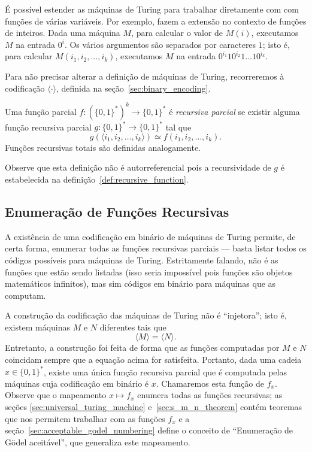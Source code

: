 É possível estender as máquinas de Turing
para trabalhar diretamente com com funções de várias variáveis.
Por exemplo, 
fazem a extensão no contexto de funções de inteiros.
Dada uma máquina $M$,
para calcular o valor de $M(i)$,
executamos $M$ na entrada $0^i$.
Os vários argumentos são separados por caracteres $1$;
isto é, para calcular $M(i_1, i_2, \dots, i_k)$,
executamos $M$ na entrada $0^{i_1} 1 0^{i_2} 1 \dots 1 0^{i_k}$.

Para não precisar alterar a definição de máquinas de Turing,
recorreremos à codificação $\langle \cdot \rangle$,
definida na seção~\ref{sec:binary_encoding}.

\begin{definition}
    \label{def:multi_valued_recursive_function}
    Uma função parcial $f: (\{0, 1\}^*)^k \to \{0, 1\}^*$ é \emph{recursiva parcial}
    se existir alguma função recursiva parcial $g: \{0, 1\}^* \to \{0, 1\}^*$
    tal que
    \begin{equation*}
        g(\langle i_1, i_2, \dots, i_k \rangle) \simeq f(i_1, i_2, \dots, i_k).
    \end{equation*}
    Funções recursivas totais são definidas analogamente.
\end{definition}

Observe que esta definição não é autorreferencial
pois a recursividade de $g$ é estabelecida na definição~\ref{def:recursive_function}.

\subsection{Enumeração de Funções Recursivas}
\label{sec:definition_enumeration_of_recursive_functions}

A existência de uma codificação em binário de máquinas de Turing
permite, de certa forma,
enumerar todas as funções recursivas parciais
--- basta listar todos os códigos possíveis para máquinas de Turing.
Estritamente falando,
não é as funções que estão sendo listadas
(isso seria impossível pois funções são objetos matemáticos infinitos),
mas sim códigos em binário para máquinas que as computam.

A construção da codificação das máquinas de Turing não é ``injetora'';
isto é, existem máquinas $M$ e $N$ diferentes
tais que
\begin{equation*}
    \langle M \rangle = \langle N \rangle.
\end{equation*}
Entretanto,
a construção foi feita de forma que
as funções computadas por $M$ e $N$ coincidam
sempre que a equação acima for satisfeita.
Portanto,
dada uma cadeia $x \in \{0, 1\}^*$,
existe uma única função recursiva parcial
que é computada pelas máquinas cuja codificação em binário é $x$.
Chamaremos esta função de $f_x$.
Observe que o mapeamento $x \mapsto f_x$
enumera todas as funções recursivas;
as seções \ref{sec:universal_turing_machine} e~\ref{sec:s_m_n_theorem}
contém teoremas que nos permitem trabalhar com as funções $f_x$
e a seção~\ref{sec:acceptable_godel_numbering}
define o conceito de ``Enumeração de Gödel aceitável'',
que generaliza este mapeamento.


